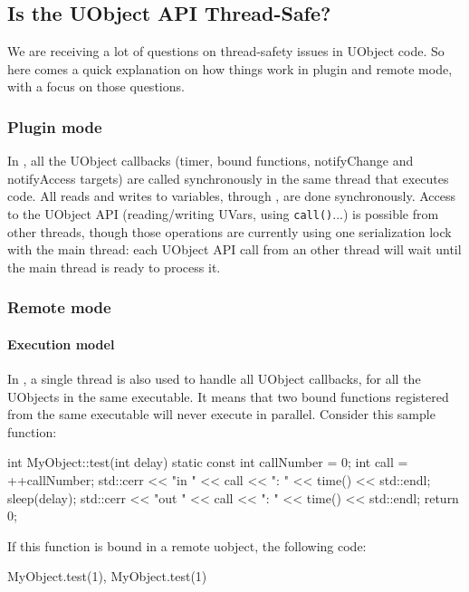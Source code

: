 \subsection{Is the UObject API Thread-Safe?}
 We are receiving a lot of questions on thread-safety
issues in UObject code. So here comes a quick explanation on how things work
in plugin and remote mode, with a focus on those questions.

\subsubsection{Plugin mode}

In , all the UObject callbacks (timer, bound functions,
notifyChange and notifyAccess targets) are called synchronously in the same
thread that executes \us code. All reads and writes to \urbi variables,
through , are done synchronously. Access to the UObject API
(reading/writing UVars, using \lstinline|call()|...) is possible from other
threads, though those operations are currently using one serialization lock
with the main thread: each UObject API call from an other thread will wait
until the main thread is ready to process it.


\subsubsection{Remote mode}

\paragraph{Execution model}

In , a single thread is also used to handle all
UObject callbacks, for all the UObjects in the same executable. It
means that two bound functions registered from the same executable
will never execute in parallel. Consider this sample \Cxx function:

\begin{cxx}
int MyObject::test(int delay)
{
  static const int callNumber = 0;
  int call = ++callNumber;
  std::cerr << "in "  << call << ": " << time() << std::endl;
  sleep(delay);
  std::cerr << "out " << call << ": " << time() << std::endl;
  return 0;
}
\end{cxx}

If this function is bound in a remote uobject, the following code:

\begin{cxx}
MyObject.test(1), MyObject.test(1)
\end{cxx}

